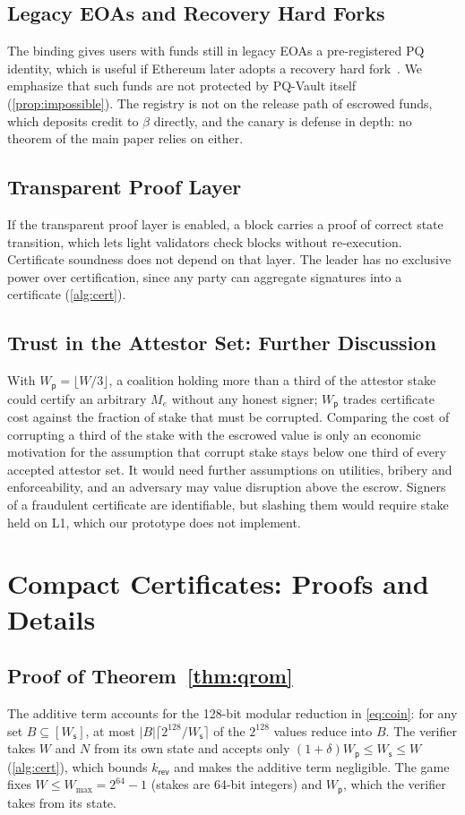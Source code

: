 \documentclass[10pt,journal,compsoc]{IEEEtran}
\theoremstyle{tplain}
\theoremstyle{tdef}
\theoremstyle{remark}
\newcommand{\Ws}{W_{\mathsf{s}}}
\newcommand{\Wp}{W_{\mathsf{p}}}
\newcommand{\kr}{k_{\mathsf{rev}}}
\begin{document}
\subsection{Legacy EOAs and Recovery Hard Forks}
The binding gives users with funds still in legacy EOAs a pre-registered PQ identity, which is useful if Ethereum later adopts a recovery hard fork~\cite{buterin2024emergency}. We emphasize that such funds are not protected by PQ-Vault itself (\cref{prop:impossible}). The registry is not on the release path of escrowed funds, which deposits credit to $\beta$ directly, and the canary is defense in depth: no theorem of the main paper relies on either.

\subsection{Transparent Proof Layer}
If the transparent proof layer is enabled, a block carries a proof of correct state transition, which lets light validators check blocks without re-execution. Certificate soundness does not depend on that layer. The leader has no exclusive power over certification, since any party can aggregate signatures into a certificate (\cref{alg:cert}).

\subsection{Trust in the Attestor Set: Further Discussion}
With $\Wp=\lfloor W/3\rfloor$, a coalition holding more than a third of the attestor stake could certify an arbitrary $M_e$ without any honest signer; $\Wp$ trades certificate cost against the fraction of stake that must be corrupted. Comparing the cost of corrupting a third of the stake with the escrowed value is only an economic motivation for the assumption that corrupt stake stays below one third of every accepted attestor set. It would need further assumptions on utilities, bribery and enforceability, and an adversary may value disruption above the escrow. Signers of a fraudulent certificate are identifiable, but slashing them would require stake held on L1, which our prototype does not implement.
\section{Compact Certificates: Proofs and Details}\label{S-cert}

\subsection{Proof of Theorem~\ref{thm:qrom}}\label{S-cert-qrom}
The additive term accounts for the 128-bit modular reduction in \cref{eq:coin}: for any set $B\subseteq[\Ws]$, at most $|B|\lceil2^{128}/\Ws\rceil$ of the $2^{128}$ values reduce into $B$. The verifier takes $W$ and $N$ from its own state and accepts only $(1+\delta)\Wp\le\Ws\le W$ (\cref{alg:cert}), which bounds $\kr$ and makes the additive term negligible. The game fixes $W\le W_{\max}=2^{64}-1$ (stakes are 64-bit integers) and $\Wp$, which the verifier takes from its state.
\end{document}

